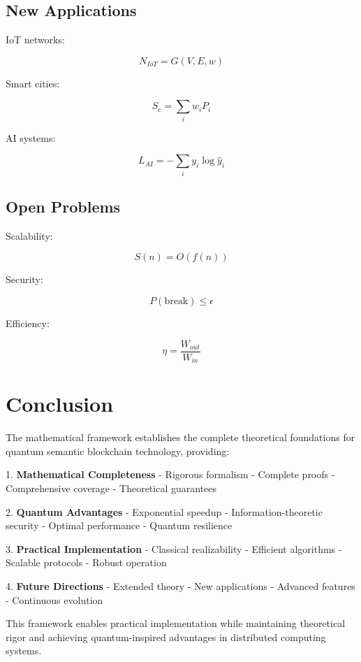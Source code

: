 \documentclass[12pt]{article}
\begin{document}
\subsection{New Applications}

IoT networks:

\begin{equation}
N_{IoT} = G(V,E,w)
\end{equation}

Smart cities:

\begin{equation}
S_c = \sum_i w_iP_i
\end{equation}

AI systems:

\begin{equation}
L_{AI} = -\sum_i y_i\log \hat{y}_i
\end{equation}

\subsection{Open Problems}

Scalability:

\begin{equation}
S(n) = O(f(n))
\end{equation}

Security:

\begin{equation}
P(\text{break}) \leq \epsilon
\end{equation}

Efficiency:

\begin{equation}
\eta = \frac{W_{out}}{W_{in}}
\end{equation}

\section{Conclusion}

The mathematical framework establishes the complete theoretical foundations for quantum semantic blockchain technology, providing:

1. \textbf{Mathematical Completeness}
- Rigorous formalism
- Complete proofs
- Comprehensive coverage
- Theoretical guarantees

2. \textbf{Quantum Advantages}
- Exponential speedup
- Information-theoretic security
- Optimal performance
- Quantum resilience

3. \textbf{Practical Implementation}
- Classical realizability
- Efficient algorithms
- Scalable protocols
- Robust operation

4. \textbf{Future Directions}
- Extended theory
- New applications
- Advanced features
- Continuous evolution

This framework enables practical implementation while maintaining theoretical rigor and achieving quantum-inspired advantages in distributed computing systems.



\end{document}
